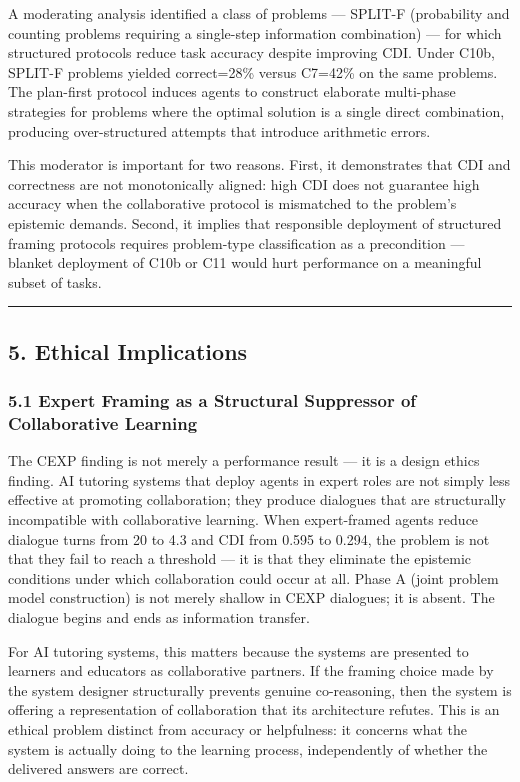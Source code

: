 \documentclass[
  11pt,
]{article}
\begin{document}
A moderating analysis identified a class of problems --- SPLIT-F
(probability and counting problems requiring a single-step information
combination) --- for which structured protocols reduce task accuracy
despite improving CDI. Under C10b, SPLIT-F problems yielded correct=28\%
versus C7=42\% on the same problems. The plan-first protocol induces
agents to construct elaborate multi-phase strategies for problems where
the optimal solution is a single direct combination, producing
over-structured attempts that introduce arithmetic errors.

This moderator is important for two reasons. First, it demonstrates that
CDI and correctness are not monotonically aligned: high CDI does not
guarantee high accuracy when the collaborative protocol is mismatched to
the problem's epistemic demands. Second, it implies that responsible
deployment of structured framing protocols requires problem-type
classification as a precondition --- blanket deployment of C10b or C11
would hurt performance on a meaningful subset of tasks.

\begin{center}\rule{0.5\linewidth}{0.5pt}\end{center}

\subsection{5. Ethical Implications}\label{ethical-implications}

\subsubsection{5.1 Expert Framing as a Structural Suppressor of Collaborative Learning}\label{expert-framing-suppressor}

The CEXP finding is not merely a performance result --- it is a design
ethics finding. AI tutoring systems that deploy agents in expert roles
are not simply less effective at promoting collaboration; they produce
dialogues that are structurally incompatible with collaborative learning.
When expert-framed agents reduce dialogue turns from 20 to 4.3 and CDI
from 0.595 to 0.294, the problem is not that they fail to reach a
threshold --- it is that they eliminate the epistemic conditions under
which collaboration could occur at all. Phase A (joint problem model
construction) is not merely shallow in CEXP dialogues; it is absent. The
dialogue begins and ends as information transfer.

For AI tutoring systems, this matters because the systems are presented
to learners and educators as collaborative partners. If the framing
choice made by the system designer structurally prevents genuine
co-reasoning, then the system is offering a representation of
collaboration that its architecture refutes. This is an ethical problem
distinct from accuracy or helpfulness: it concerns what the system is
actually doing to the learning process, independently of whether the
delivered answers are correct.
\end{document}
